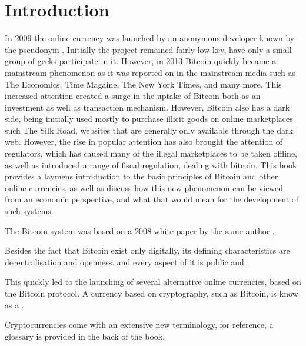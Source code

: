 
\chapter{Introduction}

In 2009 the online currency\textbf{ } was
launched by an anonymous developer known by the pseudonym .
Initially the project remained fairly low key, have only a small group
of geeks participate in it. However, in 2013 Bitcoin quickly became
a mainstream phenomenon as it was reported on in the mainstream media
such as The Economics, Time Magaine, The New York Times, and many
more. This increased attention created a surge in the uptake of Bitcoin
both as an investment as well as transaction mechanism. However, Bitcoin
also has a dark side, being initially used mostly to purchase illicit
goods on online marketplaces such The Silk Road, websites that are
generally only available through the dark web. However, the rise in
popular attention has also brought the attention of regulators, which
has caused many of the illegal marketplaces to be taken offline, as
well as introduced a range of fiscal regulation, dealing with bitcoin.
This book provides a laymens introduction to the basic principles
of Bitcoin and other online currencies, as well as discuss how this
new phenomenon can be viewed from an economic perspective, and what
that would mean for the development of such systems.

The Bitcoin system was based on a 2008 white paper by the same author
\citep{nakamoto2008bitcoin}. 

Besides the fact that Bitcoin exist only digitally, its defining characteristics
are decentralisation and openness. and every aspect of it is public
and . 

This quickly led to the launching of several alternative online currencies,
based on the Bitcoin protocol. A currency based on cryptography, such
as Bitcoin, is know as a .

Cryptocurrencies come with an extensive new terminology, for reference,
a glossary is provided in the back of the book.

